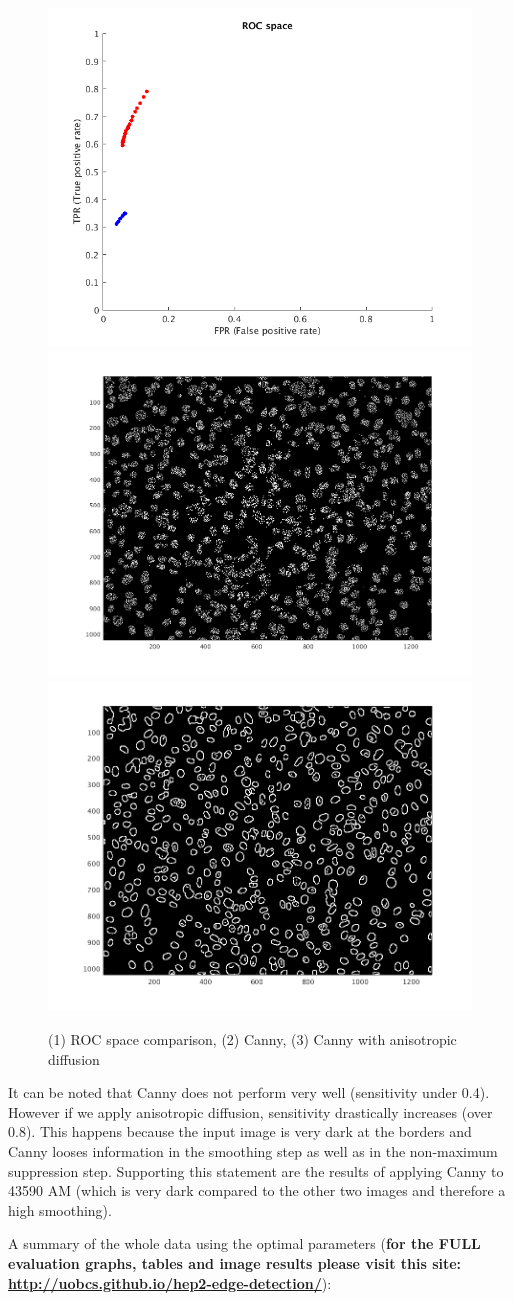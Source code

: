 \documentclass{article}
\begin{document}
\begin{figure}[htp]

\centering
\includegraphics[width=.3\textwidth]{x9343AM/comparison.png}\hfill
\includegraphics[width=.3\textwidth]{x9343AM/canny/result.png}\hfill
\includegraphics[width=.3\textwidth]{x9343AM/cad/result_15_iterations.png}

\caption{(1) ROC space comparison, (2) Canny, (3) Canny with anisotropic diffusion }
\label{fig:figure3}

\end{figure}
	
	It can be noted that Canny does not perform very well (sensitivity under 0.4).
	However if we apply anisotropic diffusion,
	sensitivity drastically increases (over 0.8). This happens because the input image
	is very dark at the borders and Canny looses information in the smoothing
	step as well as in the non-maximum suppression step. Supporting this statement
	are the results of applying Canny to 43590 AM (which is very dark compared to
	the other two images and therefore a high smoothing).
	
	A summary of the whole data using the optimal parameters (\textbf{for the FULL evaluation graphs, tables and image results please visit this site: \url{http://uobcs.github.io/hep2-edge-detection/}}):
	
\end{document}
